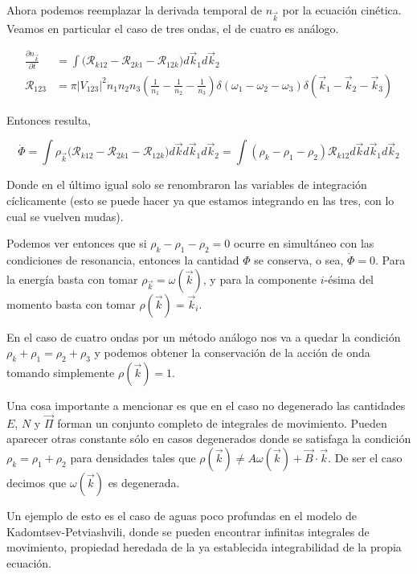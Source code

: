 Ahora podemos reemplazar la derivada temporal de $n_{\vec k}$ por la ecuación cinética. Veamos en particular el caso de tres ondas, el de cuatro es análogo.

\begin{align}
	\frac{\partial n_{\vec k}}{\partial t} &= \int \big(\mathcal{R}_{k12} -\mathcal{R}_{2k1} - \mathcal{R}_{12k}\big) d\vec k_1 d\vec k_2 \\
	\mathcal{R}_{123} &= \pi |V_{123}|^2 n_1n_2n_3\left(\frac{1}{n_1}-\frac{1}{n_2}-\frac{1}{n_3}\right)\delta(\omega_1-\omega_2-\omega_3)\delta(\vec k_1 -\vec k_2-\vec k_3)
\end{align}

Entonces resulta,

\begin{equation}
	\dot \Phi = \int \rho_{\vec k}  \big(\mathcal{R}_{k12} -\mathcal{R}_{2k1} - \mathcal{R}_{12k}\big)    d\vec  k d\vec k_1 d\vec k_2 = \int (\rho_k-\rho_1 -\rho_2) \mathcal{R}_{k12} d\vec k d\vec k_1 d\vec k_2
\end{equation}

Donde en el último igual solo se renombraron las variables de integración cíclicamente (esto se puede hacer ya que estamos integrando en las tres, con lo cual se vuelven mudas).

Podemos ver entonces que si $\rho_k-\rho_1-\rho_2=0$ ocurre en simultáneo con las condiciones de resonancia, entonces la cantidad $\Phi$ se conserva, o sea, $\dot\Phi=0$. Para la energía basta con tomar $\rho_{\vec k}=\omega(\vec k)$, y para la componente $i$-ésima del momento basta con tomar $\rho(\vec k)=\vec k_i$. 

En el caso de cuatro ondas por un método análogo nos va a quedar la condición $\rho_k+\rho_1=\rho_2+\rho_3$ y podemos obtener la conservación de la acción de onda tomando simplemente $\rho(\vec k)=1$. 

Una cosa importante a mencionar es que en el caso no degenerado las cantidades $E$, $N$ y $\vec \Pi$ forman un conjunto completo de integrales de movimiento. Pueden aparecer otras constante sólo en casos degenerados \cite{zakharovKolmogorovSpectraTurbulence1992} donde se satisfaga la condición $\rho_k=\rho_1+\rho_2$ para densidades tales que $\rho(\vec k)\neq A\omega(\vec k)+\vec B\cdot\vec k$. De ser el caso decimos que $\omega(\vec k)$ es degenerada.

Un ejemplo de esto es el caso de aguas poco profundas en el modelo de Kadomtsev-Petviashvili, donde se pueden encontrar infinitas integrales de movimiento, propiedad heredada de la ya establecida integrabilidad de la propia ecuación.

